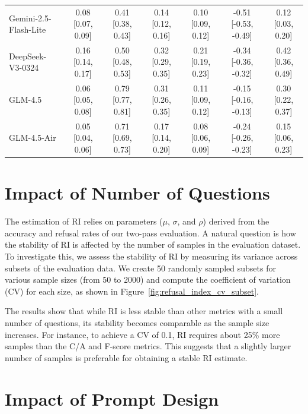 \documentclass{article} %
\theoremstyle{definition}
\begin{document}
\begin{table}[t]
\begin{tabularx}{\textwidth}{X c c c c c c}
    Gemini-2.5-Flash-Lite          & 0.08 [0.07, 0.09] & 0.41 [0.38, 0.43] & 0.14 [0.12, 0.16] & 0.10 [0.09, 0.12] & -0.51 [-0.53, -0.49] & 0.12 [0.03, 0.20] \\
    DeepSeek-V3-0324               & 0.16 [0.14, 0.17] & 0.50 [0.48, 0.53] & 0.32 [0.29, 0.35] & 0.21 [0.19, 0.23] & -0.34 [-0.36, -0.32] & 0.42 [0.36, 0.49] \\
    GLM-4.5                        & 0.06 [0.05, 0.08] & 0.79 [0.77, 0.81] & 0.31 [0.26, 0.35] & 0.11 [0.09, 0.12] & -0.15 [-0.16, -0.13] & 0.30 [0.22, 0.37] \\
    GLM-4.5-Air                    & 0.05 [0.04, 0.06] & 0.71 [0.69, 0.73] & 0.17 [0.14, 0.20] & 0.08 [0.06, 0.09] & -0.24 [-0.26, -0.23] & 0.15 [0.06, 0.23] \\
    \bottomrule
    \end{tabularx}
    \end{table}




\section{Impact of Number of Questions}

The estimation of RI relies on parameters ($\mu$, $\sigma$, and $\rho$) derived from the accuracy and refusal rates of our two-pass evaluation. A natural question is how the stability of RI is affected by the number of samples in the evaluation dataset. To investigate this, we assess the stability of RI by measuring its variance across subsets of the evaluation data. We create 50 randomly sampled subsets for various sample sizes (from 50 to 2000) and compute the coefficient of variation (CV) for each size, as shown in Figure~\ref{fig:refusal_index_cv_subset}.

The results show that while RI is less stable than other metrics with a small number of questions, its stability becomes comparable as the sample size increases. For instance, to achieve a CV of 0.1, RI requires about 25\% more samples than the C/A and F-score metrics. This suggests that a slightly larger number of samples is preferable for obtaining a stable RI estimate.

\section{Impact of Prompt Design}
\end{document}
